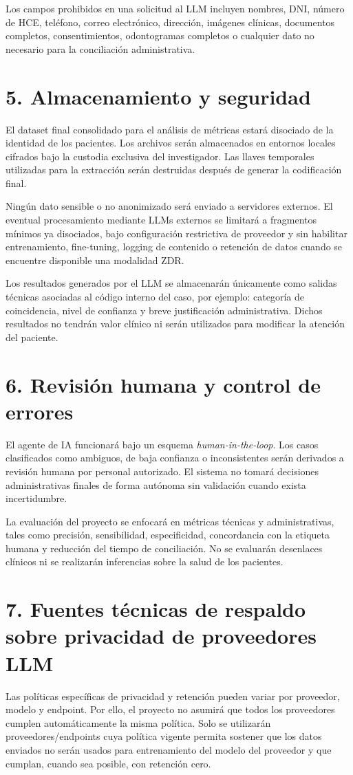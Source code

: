 \documentclass[12pt,a4paper]{article}
\begin{document}
Los campos prohibidos en una solicitud al LLM incluyen nombres, DNI, número de HCE, teléfono, correo electrónico, dirección, imágenes clínicas, documentos completos, consentimientos, odontogramas completos o cualquier dato no necesario para la conciliación administrativa.

\section*{5. Almacenamiento y seguridad}
El dataset final consolidado para el análisis de métricas estará disociado de la identidad de los pacientes. Los archivos serán almacenados en entornos locales cifrados bajo la custodia exclusiva del investigador. Las llaves temporales utilizadas para la extracción serán destruidas después de generar la codificación final.

Ningún dato sensible o no anonimizado será enviado a servidores externos. El eventual procesamiento mediante LLMs externos se limitará a fragmentos mínimos ya disociados, bajo configuración restrictiva de proveedor y sin habilitar entrenamiento, fine-tuning, logging de contenido o retención de datos cuando se encuentre disponible una modalidad ZDR.

Los resultados generados por el LLM se almacenarán únicamente como salidas técnicas asociadas al código interno del caso, por ejemplo: categoría de coincidencia, nivel de confianza y breve justificación administrativa. Dichos resultados no tendrán valor clínico ni serán utilizados para modificar la atención del paciente.

\section*{6. Revisión humana y control de errores}
El agente de IA funcionará bajo un esquema \textit{human-in-the-loop}. Los casos clasificados como ambiguos, de baja confianza o inconsistentes serán derivados a revisión humana por personal autorizado. El sistema no tomará decisiones administrativas finales de forma autónoma sin validación cuando exista incertidumbre.

La evaluación del proyecto se enfocará en métricas técnicas y administrativas, tales como precisión, sensibilidad, especificidad, concordancia con la etiqueta humana y reducción del tiempo de conciliación. No se evaluarán desenlaces clínicos ni se realizarán inferencias sobre la salud de los pacientes.

\section*{7. Fuentes técnicas de respaldo sobre privacidad de proveedores LLM}
Las políticas específicas de privacidad y retención pueden variar por proveedor, modelo y endpoint. Por ello, el proyecto no asumirá que todos los proveedores cumplen automáticamente la misma política. Solo se utilizarán proveedores/endpoints cuya política vigente permita sostener que los datos enviados no serán usados para entrenamiento del modelo del proveedor y que cumplan, cuando sea posible, con retención cero.
\end{document}
